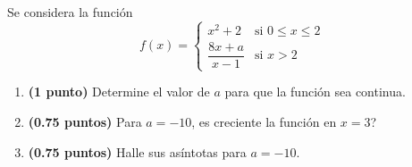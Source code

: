 
Se considera la función
\[
f(x)=\begin{cases}
x^2+2 & \text{si }0\leq x\leq2\\[4pt]
\dfrac{8x+a}{x-1} & \text{si }x>2
\end{cases}
\]
\begin{enumerate}[label=\alph*)]
\item \textbf{(1 punto)} Determine el valor de $a$ para que la función sea continua.
\item \textbf{(0.75 puntos)} \textquestiondown{}Para $a=-10$, es creciente la función en $x=3$?
\item \textbf{(0.75 puntos)} Halle sus asíntotas para $a=-10$.
\end{enumerate}
